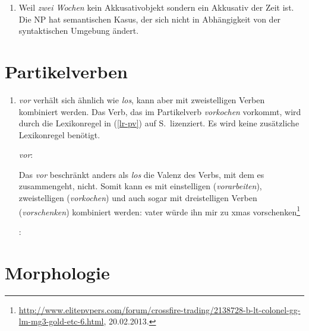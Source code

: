 \begin{enumerate}
\item Weil \emph{zwei Wochen} kein Akkusativobjekt sondern ein Akkusativ der Zeit ist. Die NP hat
  semantischen Kasus, der sich nicht in Abhängigkeit von der syntaktischen Umgebung ändert.

\end{enumerate}


\section{Partikelverben}

\begin{enumerate}
\item \emph{vor} verhält sich ähnlich wie \emph{los}, kann aber mit zweistelligen Verben kombiniert
  werden. Das Verb, das im Partikelverb \emph{vorkochen} vorkommt, wird durch die Lexikonregel in
  (\ref{lr-pv}) auf S.\,\pageref{lr-pv} lizenziert. Es wird keine zusätzliche Lexikonregel benötigt.

\eas
\label{le-vor}%
\emph{vor}:\\
\zs{}

Das \emph{vor} beschränkt anders als \emph{los} die Valenz des Verbs, mit dem es zusammengeht,
nicht. Somit kann es mit einstelligen (\emph{vorarbeiten}), zweistelligen (\emph{vorkochen}) und
auch sogar mit dreistelligen Verben (\emph{vorschenken}) kombiniert werden:
\ea
vater würde ihn mir zu xmas vorschenken\footnote{
  \url{http://www.elitepvpers.com/forum/crossfire-trading/2138728-b-lt-colonel-gg-lm-mg3-gold-etc-6.html}, 20.02.2013.
}
\z

\eas
\label{le-kochen}%
:\\
\zs

\end{enumerate}


\section{Morphologie}



